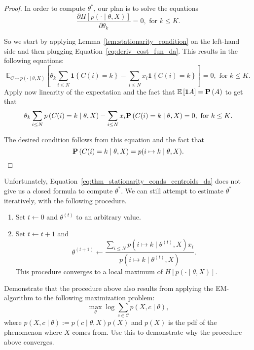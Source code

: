 \begin{proof}
In order to compute $\theta^*$, our plan is to solve the equations
%
\begin{equation}
\frac{\partial H \left[p(\cdot \mid \theta, X)\right]}{\partial \theta_k} = 0, \text{ for $k \leq K$}.
\end{equation}

So we start by applying Lemma~\ref{lem:stationarity_condition} on the left-hand side and then plugging Equation~\ref{eq:deriv_cost_fun_da}. This results in the following equations:
%
\begin{equation}
\mathbb{E}_{C \sim p(\cdot \mid \theta, X)}\left[\theta_k \sum_{i \leq N} \mathbf{1}\left\{C(i) = k\right\} - \sum_{i \leq N} x_i \mathbf{1}\left\{C(i) = k\right\}\right] = 0, \text{ for $k \leq K$}.
\end{equation}
%
Apply now linearity of the expectation and the fact that $\mathbb{E}\left[\mathbf{1}A\right] = \mathbf{P}\left(A\right)$ to get that
%
\begin{equation}
\theta_k \sum_{i \leq N} p\left(C(i) = k \mid \theta, X\right) - \sum_{i \leq N}x_i \mathbf{P}\left(C(i) = k \mid \theta, X\right) = 0, \text{ for $k \leq K$}.
\end{equation}

The desired condition follows from this equation and the fact that 
%
\begin{equation}
\mathbf{P}\left(C(i) = k \mid \theta, X\right) = p(i \mapsto k \mid \theta, X).
\end{equation}
\end{proof}

Unfortunately, Equation~\ref{eq:thm_stationarity_conds_centroids_da} does not give us a closed formula to compute $\theta^*$. We can still attempt to estimate $\theta^*$ iteratively, with the following
procedure.

\begin{enumerate}
\item Set $t \gets 0$ and $\theta^(t)$ to an arbitrary value.
\item Set $t \gets t + 1$ and
%
\begin{equation}
\theta^{(t+1)} \gets \frac{\sum_{i \leq N} p\left(i \mapsto k \mid \theta^{(t)}, X\right)x_i}{p\left(i \mapsto k \mid \theta^{(t)}, X\right)}.
\end{equation}
%
This procedure converges to a local maximum of $H[p(\cdot \mid \theta, X)]$.
\end{enumerate}

\begin{exercise}
Demonstrate that the procedure above also results from applying
the EM-algorithm to the following maximization problem:
%
\begin{equation}
\max_{\theta} \log \sum_{c \in \mathcal{C}} p(X, c \mid \theta),
\end{equation}
%
where $p(X, c \mid \theta) := p(c \mid \theta, X)p(X)$ and $p(X)$ is the pdf of the phenomenon where $X$ comes from. Use this to demonstrate why the procedure above
converges.
\end{exercise}

